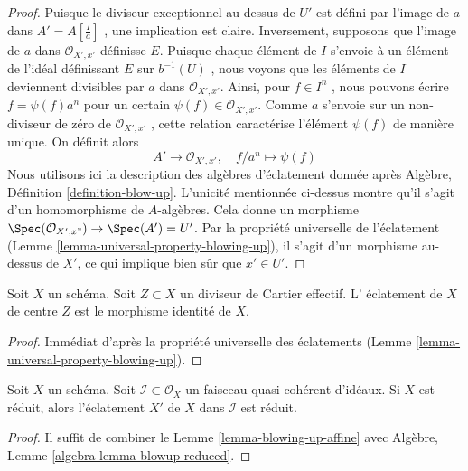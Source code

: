 \begin{proof}
Puisque le diviseur exceptionnel au-dessus de  $U'$  est défini par l'image
de  $a$  dans  $A' = A[\frac{I}{a}]$ , une implication est claire. Inversement,
supposons que l'image de  $a$  dans  $\mathcal{O}_{X', x'}$  définisse  $E$.
Puisque chaque élément de  $I$  s'envoie à un élément de l'idéal
définissant  $E$  sur  $b^{-1}(U)$ , nous voyons que les éléments de
 $I$  deviennent divisibles par  $a$  dans  $\mathcal{O}_{X', x'}$. Ainsi, pour
 $f \in I^n$ , nous pouvons écrire  $f = \psi(f) a^n$  pour un certain  $\psi(f) \in \mathcal{O}_{X', x'}$.
Comme  $a$  s'envoie sur un non-diviseur de zéro de
 $\mathcal{O}_{X', x'}$ , cette relation caractérise l'élément  $\psi(f)$  de manière unique.
On définit alors
$$
A' \longrightarrow \mathcal{O}_{X', x'},\quad
f/a^n \longmapsto \psi(f)
$$
Nous utilisons ici la description des algèbres d'éclatement donnée après
Algèbre, Définition  \ref{definition-blow-up}. L'unicité mentionnée ci-dessus montre qu'il
s'agit d'un homomorphisme de  $A$-algèbres. Cela donne un morphisme
 $\Spec(\mathcal{O}_{X', x"}) \to \Spec(A') = U'$. Par la propriété universelle de l'éclatement (Lemme  \ref{lemma-universal-property-blowing-up}), il
s'agit d'un morphisme au-dessus de  $X'$, ce qui implique bien sûr que
 $x' \in U'$.
\end{proof}

\begin{lemma}
\label{lemma-blow-up-effective-Cartier-divisor}
Soit  $X$  un schéma. Soit  $Z \subset X$  un diviseur de Cartier effectif. L'
éclatement de  $X$  de centre  $Z$  est le morphisme identité de
 $X$.
\end{lemma}

\begin{proof}
Immédiat d'après la propriété universelle des éclatements (Lemme  \ref{lemma-universal-property-blowing-up}).
\end{proof}

\begin{lemma}
\label{lemma-blow-up-reduced-scheme}
Soit  $X$  un schéma. Soit  $\mathcal{I} \subset \mathcal{O}_X$  un faisceau quasi-cohérent
d'idéaux. Si  $X$  est réduit, alors l'éclatement  $X'$  de
 $X$  dans  $\mathcal{I}$  est réduit.
\end{lemma}

\begin{proof}
Il suffit de combiner le Lemme  \ref{lemma-blowing-up-affine}  avec Algèbre, Lemme  \ref{algebra-lemma-blowup-reduced}.
\end{proof}

